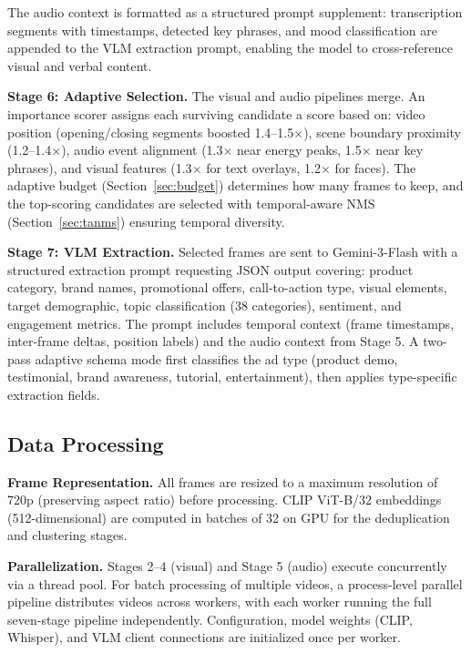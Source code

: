 \documentclass[sigconf,nonacm]{acmart}
\begin{document}
The audio context is formatted as a structured prompt supplement: transcription segments with timestamps, detected key phrases, and mood classification are appended to the VLM extraction prompt, enabling the model to cross-reference visual and verbal content.

\textbf{Stage 6: Adaptive Selection.} The visual and audio pipelines merge. An importance scorer assigns each surviving candidate a score based on: video position (opening/closing segments boosted 1.4--1.5$\times$), scene boundary proximity (1.2--1.4$\times$), audio event alignment (1.3$\times$ near energy peaks, 1.5$\times$ near key phrases), and visual features (1.3$\times$ for text overlays, 1.2$\times$ for faces). The adaptive budget (Section~\ref{sec:budget}) determines how many frames to keep, and the top-scoring candidates are selected with temporal-aware NMS (Section~\ref{sec:tanms}) ensuring temporal diversity.

\textbf{Stage 7: VLM Extraction.} Selected frames are sent to Gemini-3-Flash with a structured extraction prompt requesting JSON output covering: product category, brand names, promotional offers, call-to-action type, visual elements, target demographic, topic classification (38 categories), sentiment, and engagement metrics. The prompt includes temporal context (frame timestamps, inter-frame deltas, position labels) and the audio context from Stage 5. A two-pass adaptive schema mode first classifies the ad type (product demo, testimonial, brand awareness, tutorial, entertainment), then applies type-specific extraction fields.

\subsection{Data Processing}
\label{sec:data_processing}

\textbf{Frame Representation.} All frames are resized to a maximum resolution of 720p (preserving aspect ratio) before processing. CLIP ViT-B/32 embeddings (512-dimensional) are computed in batches of 32 on GPU for the deduplication and clustering stages.

\textbf{Parallelization.} Stages 2--4 (visual) and Stage 5 (audio) execute concurrently via a thread pool. For batch processing of multiple videos, a process-level parallel pipeline distributes videos across workers, with each worker running the full seven-stage pipeline independently. Configuration, model weights (CLIP, Whisper), and VLM client connections are initialized once per worker.
\end{document}
